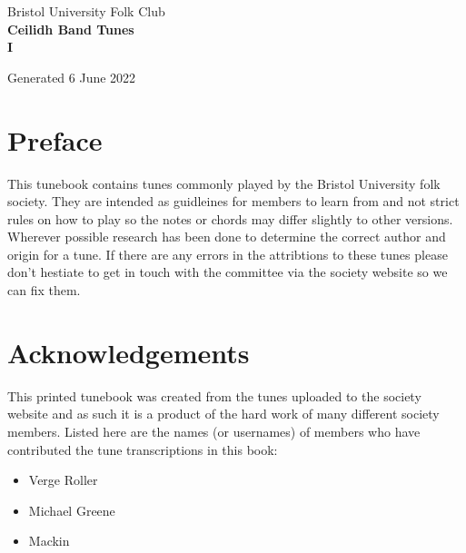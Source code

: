 \documentclass[12pt,a4paper,twoside]{article}
\makeatletter
\newcommand{\thetitle}{Ceilidh Band Tunes \\ \vspace{0.65cm} I}
\newcommand{\thedate}{6 June 2022}
\renewcommand\tableofcontents{%
    \begin{multicols}{2}[
      \centering
      \section*{\large\contentsname
        \@mkboth{%
           \MakeUppercase\contentsname}{\MakeUppercase\contentsname}}]
    \@starttoc{toc}%
    \end{multicols}
}
\makeatother
\begin{document}
\begin{titlepage}
   \begin{center}
       \large Bristol University Folk Club \\

       \vspace{4cm}
       \textbf{\Huge \thetitle}

       \vspace{0.5cm}
       Generated \thedate

       \vspace{1.5cm}

       \vfill

   \end{center}
\end{titlepage}

\tableofcontents

\section{Preface}

This tunebook contains tunes commonly played by the Bristol University folk society. They are intended as guidleines for members to learn from and not strict rules on how to play so the notes or chords may differ slightly to other versions.
Wherever possible research has been done to determine the correct author and origin for a tune. If there are any errors in the attribtions to these tunes please don't hestiate to get in touch with the committee via the society website so we can fix them.

\section{Acknowledgements}

This printed tunebook was created from the tunes uploaded to the society website and as such it is a product of the hard work of many different society members. Listed here are the names (or usernames) of members who have contributed the tune transcriptions in this book:

\begin{multicols}{2}
\begin{itemize}\item Verge Roller
\item Michael Greene
\item Mackin
\end{itemize}

\end{multicols}
\end{document}

